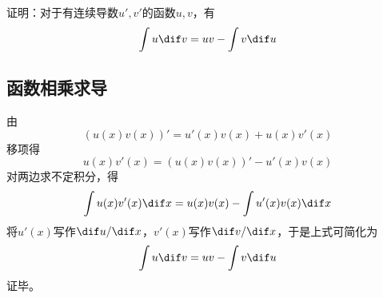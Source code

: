 

证明：对于有连续导数$u', v'$的函数$u, v$，有
\[ \int u \dif v = uv - \int v \dif u \]

\subsection{函数相乘求导}

由
\[ \left(u(x)v(x)\right)' = u'(x)v(x) + u(x)v'(x) \]
移项得
\[ u(x)v'(x) = \left(u(x)v(x)\right)' - u'(x)v(x) \]
对两边求不定积分，得
\[ \int u(x)v'(x) \dif x = u(x)v(x) - \int u'(x)v(x) \dif x \]
将$u'(x)$写作$\dif u/\dif x$，$v'(x)$写作$\dif v/\dif x$，于是上式可简化为
\[ \int u \dif v = uv - \int v \dif u \]
证毕。
